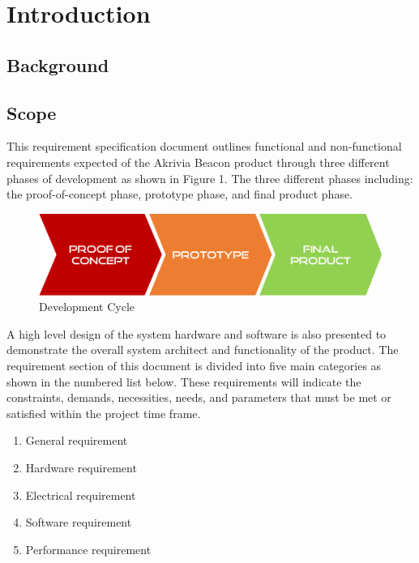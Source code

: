 %




\setcounter{section}{0}
\section{Introduction}
\bigskip
\subsection{Background}
\break



\subsection{Scope}
This requirement specification document outlines functional and non-functional requirements expected of the Akrivia Beacon product through three different phases of development as shown in Figure 1. The three different phases  including: the proof-of-concept phase, prototype phase, and final product phase.
\medskip

\begin{figure}[H]
\centering
    \includegraphics[scale=0.4]{./images/dev-path.png}
    \caption{Development Cycle}
\end{figure}

A high level design of the system hardware and software is also presented to demonstrate the overall system architect and functionality of the product. The requirement section of this document is divided into five main categories as shown in the numbered list below. These requirements will indicate the constraints, demands, necessities, needs, and parameters that must be met or satisfied within the project time frame.

\begin{enumerate}
	\item General requirement 
	\item Hardware requirement 
	\item Electrical requirement 
	\item Software requirement 
	\item Performance requirement 
\end{enumerate}
\medskip

